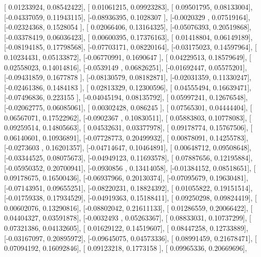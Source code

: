 \documentclass{article}
\begin{document}
       [ 0.01233924,  0.08542422],
       [ 0.01061215,  0.09923283],
       [ 0.09501795,  0.08133004],
       [-0.04337059,  0.11943115],
       [-0.08936395,  0.1028307 ],
       [-0.0020329 ,  0.07519164],
       [-0.02324368,  0.1528054 ],
       [ 0.02066406,  0.13164325],
       [-0.05076393,  0.20519868],
       [-0.03378419,  0.06036423],
       [ 0.00600395,  0.17376163],
       [ 0.01418804,  0.06149189],
       [-0.08194185,  0.17798568],
       [-0.07703171,  0.08220164],
       [-0.03175023,  0.14597964],
       [ 0.10234431,  0.05133872],
       [-0.06770991,  0.1690647 ],
       [ 0.04229513,  0.18579649],
       [ 0.02558023,  0.14014816],
       [-0.0539149 ,  0.06826251],
       [-0.01692447,  0.05575201],
       [-0.09431859,  0.1677878 ],
       [-0.08130579,  0.08182871],
       [-0.02031359,  0.11330247],
       [-0.02461386,  0.1484183 ],
       [ 0.02813329,  0.12300596],
       [ 0.04555494,  0.16639471],
       [-0.07496836,  0.223155  ],
       [-0.04045194,  0.08135792],
       [ 0.05997241,  0.12676548],
       [-0.02062775,  0.06085061],
       [ 0.00302428,  0.086245  ],
       [ 0.07565301,  0.04444404],
       [ 0.06567071,  0.17522962],
       [-0.0902367 ,  0.10830511],
       [ 0.05883803,  0.10778083],
       [ 0.09259514,  0.14805663],
       [ 0.04532631,  0.03377978],
       [ 0.09178774,  0.15767506],
       [ 0.06140601,  0.10936891],
       [-0.07728773,  0.20499932],
       [ 0.00878091,  0.14255783],
       [-0.0273603 ,  0.16201357],
       [-0.04714647,  0.10464891],
       [ 0.00648712,  0.09508648],
       [-0.03344525,  0.08075673],
       [-0.04949123,  0.11693578],
       [ 0.07887656,  0.12195884],
       [-0.05950352,  0.20700941],
       [-0.0930856 ,  0.13414058],
       [-0.01384152,  0.08518651],
       [ 0.09178675,  0.16500436],
       [-0.06937966,  0.20130374],
       [-0.07095679,  0.19630481],
       [-0.07143951,  0.09655251],
       [-0.08220231,  0.18824392],
       [ 0.01055822,  0.19151514],
       [-0.01759338,  0.17934529],
       [-0.04919363,  0.15188411],
       [ 0.09250298,  0.09824419],
       [ 0.00602076,  0.13290816],
       [-0.08802042,  0.21611133],
       [ 0.01286559,  0.20066422],
       [ 0.04404327,  0.03591878],
       [-0.0032493 ,  0.05263367],
       [ 0.08833031,  0.10737299],
       [ 0.07321386,  0.04132605],
       [ 0.01629122,  0.14519607],
       [ 0.08447258,  0.12733889],
       [-0.03167097,  0.20895972],
       [-0.09645075,  0.04573336],
       [ 0.08991459,  0.21678471],
       [ 0.07094192,  0.16092846],
       [ 0.09123218,  0.1773158 ],
       [ 0.09965336,  0.20669696],
\end{document}
